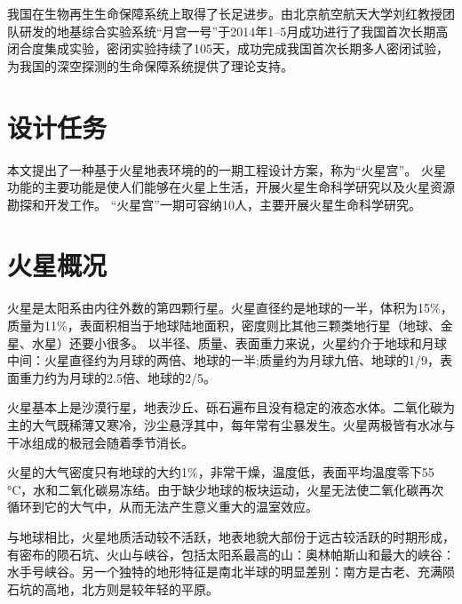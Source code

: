 我国在生物再生生命保障系统上取得了长足进步。由北京航空航天大学刘红教授团队研发的地基综合实验系统“月宫一号”于2014年1--5月成功进行了我国首次长期高闭合度集成实验，密闭实验持续了105天，成功完成我国首次长期多人密闭试验，为我国的深空探测的生命保障系统提供了理论支持。

\section{设计任务}
本文提出了一种基于火星地表环境的\BLLS 的一期工程设计方案，称为“火星宫”。
火星功能的主要功能是使人们能够在火星上生活，开展火星生命科学研究以及火星资源勘探和开发工作。
“火星宫”一期可容纳10人，主要开展火星生命科学研究。

\section{火星概况}
\label{chp:intro:end}

火星是太阳系由内往外数的第四颗行星。火星直径约是地球的一半，体积为15\%，质量为11\%，表面积相当于地球陆地面积，密度则比其他三颗类地行星（地球、金星、水星）还要小很多。 以半径、质量、表面重力来说，火星约介于地球和月球中间：火星直径约为月球的两倍、地球的一半;质量约为月球九倍、地球的1/9，表面重力约为月球的2.5倍、地球的2/5。

火星基本上是沙漠行星，地表沙丘、砾石遍布且没有稳定的液态水体。二氧化碳为主的大气既稀薄又寒冷，沙尘悬浮其中，每年常有尘暴发生。火星两极皆有水冰与干冰组成的极冠会随着季节消长。

火星的大气密度只有地球的大约1\%，非常干燥，温度低，表面平均温度零下55 \si{\degreeCelsius}，水和二氧化碳易冻结。由于缺少地球的板块运动，火星无法使二氧化碳再次循环到它的大气中，从而无法产生意义重大的温室效应。

与地球相比，火星地质活动较不活跃，地表地貌大部份于远古较活跃的时期形成，有密布的陨石坑、火山与峡谷，包括太阳系最高的山：奥林帕斯山和最大的峡谷：水手号峡谷。另一个独特的地形特征是南北半球的明显差别：南方是古老、充满陨石坑的高地，北方则是较年轻的平原。
